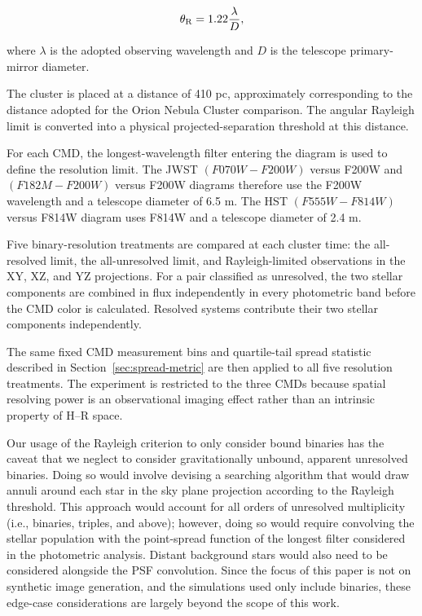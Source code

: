 \documentclass[linenumbers, twocolumn]{aastex631}
\begin{document}
 
\begin{equation}
\theta_{\rm R} = 1.22\frac{\lambda}{D},
\end{equation}

where $\lambda$ is the adopted observing wavelength and $D$ is the telescope primary-mirror diameter.

The cluster is placed at a distance of 410 pc, approximately corresponding to the distance adopted for the Orion Nebula Cluster comparison. The angular Rayleigh limit is converted into a physical projected-separation threshold at this distance. 

For each CMD, the longest-wavelength filter entering the diagram is used to define the resolution limit. The JWST
$(F070W-F200W)$ versus F200W and
$(F182M-F200W)$ versus F200W diagrams therefore use the F200W wavelength and a telescope diameter of 6.5 m. The HST $(F555W-F814W)$ versus F814W diagram uses F814W and a telescope diameter of 2.4 m.

Five binary-resolution treatments are compared at each cluster time: the all-resolved limit, the all-unresolved limit, and Rayleigh-limited observations in the XY, XZ, and YZ projections. For a pair classified as unresolved, the two stellar components are combined in flux independently in every photometric band before the CMD color is calculated. Resolved systems contribute their two stellar components independently.

The same fixed CMD measurement bins and quartile-tail spread statistic described in Section~\ref{sec:spread-metric} are then applied to all five resolution treatments. The experiment is restricted to the three CMDs because spatial resolving power is an observational imaging effect rather than an intrinsic property of H--R space.

Our usage of the Rayleigh criterion to only consider bound binaries has the caveat that we neglect to consider gravitationally unbound, apparent unresolved binaries. Doing so would involve devising a searching algorithm that would draw annuli around each star in the sky plane projection according to the Rayleigh threshold. This approach would account for all orders of unresolved multiplicity (i.e., binaries, triples, and above); however, doing so would require convolving the stellar population with the point-spread function of the longest filter considered in the photometric analysis. Distant background stars would also need to be considered alongside the PSF convolution. Since the focus of this paper is not on synthetic image generation, and the simulations used only include binaries, these edge-case considerations are largely beyond the scope of this work.
\end{document}
